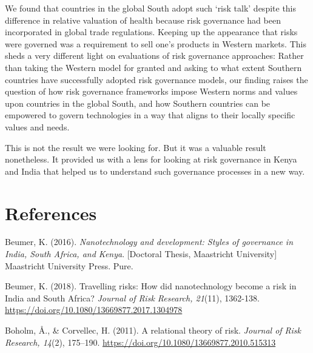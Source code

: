 \documentclass[authordate, anecdote]{jote-new-article}
\begin{document}
	We found that countries in the global South adopt such ‘risk talk' despite this difference in relative valuation of health because risk governance had been incorporated in global trade regulations. Keeping up the appearance that risks were governed was a requirement to sell one's products in Western markets. This sheds a very different light on evaluations of risk governance approaches: Rather than taking the Western model for granted and asking to what extent Southern countries have successfully adopted risk governance models, our finding raises the question of how risk governance frameworks impose Western norms and values upon countries in the global South, and how Southern countries can be empowered to govern technologies in a way that aligns to their locally specific values and needs.



	This is not the result we were looking for. But it was a valuable result nonetheless. It provided us with a lens for looking at risk governance in Kenya and India that helped us to understand such governance processes in a new way.






	\section{References}



	Beumer, K. (2016). \emph{Nanotechnology and development: Styles of governance in India, South Africa, and Kenya}. [Doctoral Thesis, Maastricht University] Maastricht University Press. Pure.



	Beumer, K. (2018). Travelling risks: How did nanotechnology become a risk in India and South Africa? \emph{Journal of Risk Research, 21}(11), 1362-138. \url{https://doi.org/10.1080/13669877.2017.1304978}



	Boholm, Å., \& Corvellec, H. (2011). A relational theory of risk. \emph{Journal of Risk Research, 14}(2), 175--190. \url{https://doi.org/10.1080/13669877.2010.515313}
\end{document}

